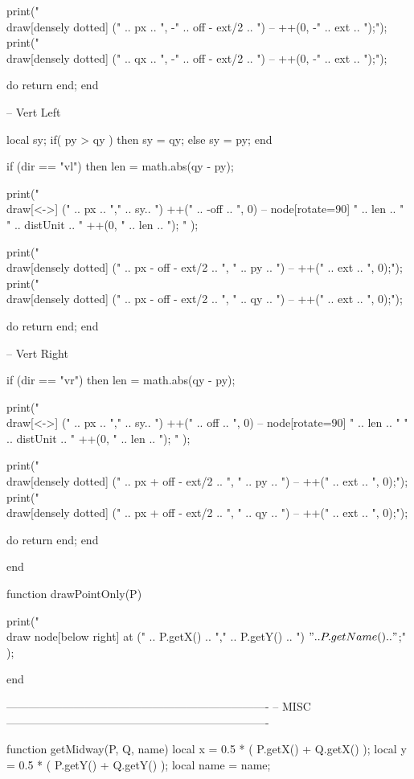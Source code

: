 \begin{luacode}
		print("\\draw[densely dotted] (" .. px .. ", -" .. off - ext/2  .. ") -- ++(0, -" .. ext .. ");");
		print("\\draw[densely dotted] (" .. qx .. ", -" .. off - ext/2  .. ") -- ++(0, -" .. ext .. ");");
		
		do return end;
	end
	
	-- Vert Left
	
	local sy;
	if( py > qy ) then sy = qy; else sy = py; end
	
	if (dir == "vl") then
		len = math.abs(qy - py);
		
		print("\\draw[<->] (" .. px .. "," .. sy.. ") ++(" .. -off .. ", 0) -- node[rotate=90] {" .. len .. " " .. distUnit .. "} ++(0, " .. len .. "); " );
		
		print("\\draw[densely dotted] (" .. px - off - ext/2 .. ", " .. py  .. ") -- ++(" .. ext .. ", 0);");
		print("\\draw[densely dotted] (" .. px - off - ext/2 .. ", " .. qy  .. ") -- ++(" .. ext .. ", 0);");
		
		do return end;
	end
	
	-- Vert Right
	
	if (dir == "vr") then
		len = math.abs(qy - py);
		
		print("\\draw[<->] (" .. px .. "," .. sy.. ") ++(" .. off .. ", 0) -- node[rotate=90] {" .. len .. " " .. distUnit .. "} ++(0, " .. len .. "); " );
		
		print("\\draw[densely dotted] (" .. px + off - ext/2 .. ", " .. py  .. ") -- ++(" .. ext .. ", 0);");
		print("\\draw[densely dotted] (" .. px + off - ext/2 .. ", " .. qy  .. ") -- ++(" .. ext .. ", 0);");
		
		do return end;
	end
	
end

function drawPointOnly(P)
	
	print("\\draw node[below right] at (" .. P.getX() .. "," .. P.getY() .. ") {$" .. P.getName().. "$};" );
	    
end

----------------------------------------------------------------------
-- MISC
----------------------------------------------------------------------

function getMidway(P, Q, name)
	local x = 0.5 * ( P.getX() + Q.getX() );
	local y = 0.5 * ( P.getY() + Q.getY() );
	local name = name;
	

\end{luacode}
